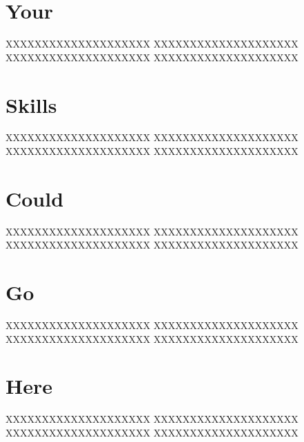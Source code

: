 \documentclass[letterpaper]{easyCV}
\begin{document}
\address{5813 $21^{st}$ Street Apt. 34}

\begin{sidebar}[Skills]

\section{Your}
XXXXXXXXXXXXXXXXXXXX
XXXXXXXXXXXXXXXXXXXX
XXXXXXXXXXXXXXXXXXXX
XXXXXXXXXXXXXXXXXXXX

\section{Skills}
XXXXXXXXXXXXXXXXXXXX
XXXXXXXXXXXXXXXXXXXX
XXXXXXXXXXXXXXXXXXXX
XXXXXXXXXXXXXXXXXXXX

\section{Could}
XXXXXXXXXXXXXXXXXXXX
XXXXXXXXXXXXXXXXXXXX
XXXXXXXXXXXXXXXXXXXX
XXXXXXXXXXXXXXXXXXXX

\section{Go}
XXXXXXXXXXXXXXXXXXXX
XXXXXXXXXXXXXXXXXXXX
XXXXXXXXXXXXXXXXXXXX
XXXXXXXXXXXXXXXXXXXX

\section{Here}
XXXXXXXXXXXXXXXXXXXX
XXXXXXXXXXXXXXXXXXXX
XXXXXXXXXXXXXXXXXXXX
XXXXXXXXXXXXXXXXXXXX

\end{sidebar}
\end{document}
